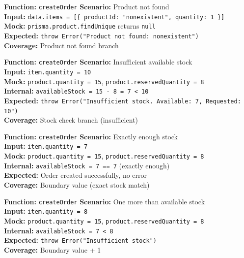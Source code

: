 \documentclass[12pt,a4paper]{report}
\newcommand{\ptwo}{\textbf{\color{p2orange}P2}}
\newcommand{\pthree}{\textbf{\color{p3blue}P3}}
\begin{document}
\begin{tcolorbox}[testbox,title={ORD-003 \hfill \ptwo}]
\textbf{Function:} \texttt{createOrder} \quad \textbf{Scenario:} Product not found \\
\textbf{Input:} \texttt{data.items = [\{ productId: "nonexistent", quantity: 1 \}]} \\
\textbf{Mock:} \texttt{prisma.product.findUnique} returns \texttt{null} \\
\textbf{Expected:} \texttt{throw Error("Product not found: nonexistent")} \\
\textbf{Coverage:} Product not found branch
\end{tcolorbox}

\begin{tcolorbox}[criticalbox,title={ORD-004 \hfill \ptwo\ --- Insufficient Stock}]
\textbf{Function:} \texttt{createOrder} \quad \textbf{Scenario:} Insufficient available stock \\
\textbf{Input:} \texttt{item.quantity = 10} \\
\textbf{Mock:} \texttt{product.quantity = 15}, \texttt{product.reservedQuantity = 8} \\
\textbf{Internal:} \texttt{availableStock = 15 - 8 = 7 < 10} \\
\textbf{Expected:} \texttt{throw Error("Insufficient stock. Available: 7, Requested: 10")} \\
\textbf{Coverage:} Stock check branch (insufficient)
\end{tcolorbox}

\begin{tcolorbox}[testbox,title={ORD-005 \hfill \pthree\ --- Boundary}]
\textbf{Function:} \texttt{createOrder} \quad \textbf{Scenario:} Exactly enough stock \\
\textbf{Input:} \texttt{item.quantity = 7} \\
\textbf{Mock:} \texttt{product.quantity = 15}, \texttt{product.reservedQuantity = 8} \\
\textbf{Internal:} \texttt{availableStock = 7 == 7} (exactly enough) \\
\textbf{Expected:} Order created successfully, no error \\
\textbf{Coverage:} Boundary value (exact stock match)
\end{tcolorbox}

\begin{tcolorbox}[testbox,title={ORD-006 \hfill \pthree\ --- Boundary+1}]
\textbf{Function:} \texttt{createOrder} \quad \textbf{Scenario:} One more than available stock \\
\textbf{Input:} \texttt{item.quantity = 8} \\
\textbf{Mock:} \texttt{product.quantity = 15}, \texttt{product.reservedQuantity = 8} \\
\textbf{Internal:} \texttt{availableStock = 7 < 8} \\
\textbf{Expected:} \texttt{throw Error("Insufficient stock")} \\
\textbf{Coverage:} Boundary value + 1
\end{tcolorbox}
\end{document}
